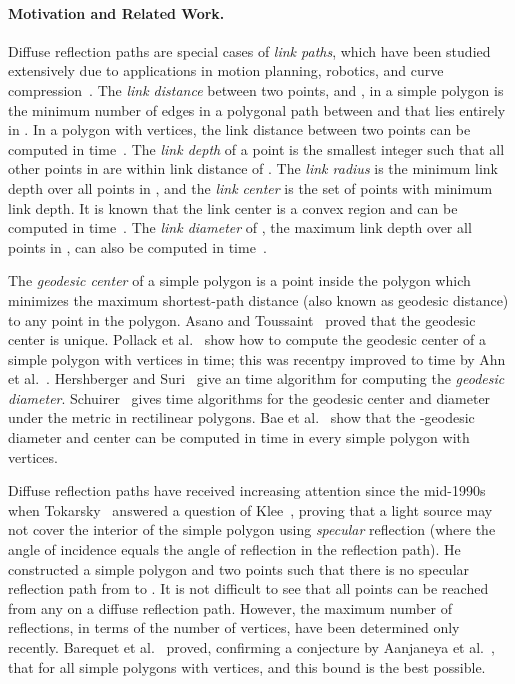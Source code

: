 \documentclass[12pt]{article}
\begin{document}
\paragraph{\bf Motivation and Related Work.}
Diffuse reflection paths are special cases of \emph{link paths}, which have been studied extensively due to applications in motion planning, robotics, and curve compression~\cite{G07,MSD00}.
The \emph{link distance} between two points,  and , in a simple polygon  is the minimum number of edges in a polygonal path between  and  that lies entirely in .
In a polygon  with  vertices, the link distance between two points can be computed in  time~\cite{S86}.
The \emph{link depth} of a point  is the smallest integer  such that all other points in  are within link distance  of .
The \emph{link radius} is the minimum link depth over all points in , and the \emph{link center} is the set of points with minimum link depth.
It is known that the link center is a convex region and can be computed in  time~\cite{DLS92}.
The \emph{link diameter} of , the maximum link depth over all points in , can also be computed in  time~\cite{S90}.

The \emph{geodesic center} of a simple polygon is a point inside the polygon which minimizes the maximum shortest-path distance  (also known as geodesic distance) to any point in the polygon. Asano and Toussaint~\cite{AT85} proved that the geodesic center is unique. Pollack et al.~\cite{PSR89} show how to compute the geodesic center of a simple polygon with  vertices in  time; this was recentpy improved to  time by Ahn et al.~\cite{ABB+15}. Hershberger and Suri~\cite{HS97} give an  time algorithm for computing the \emph{geodesic diameter}. Schuirer~\cite{Sch94} gives  time algorithms for the geodesic center and diameter under the  metric in rectilinear polygons. Bae et al.~\cite{BKOW14} show that the -geodesic diameter and center can be computed in  time in every simple polygon with  vertices.

Diffuse reflection paths have received increasing attention since the mid-1990s when Tokarsky~\cite{Tok95} answered a question of Klee~\cite{Kle69,Kle79}, proving that a light source may not cover the interior of the simple polygon using \emph{specular} reflection (where the angle of incidence equals the angle of reflection in the reflection path).
He constructed a simple polygon  and two points  such that there is no specular reflection path from  to . It is not difficult to see that all points  can be reached from any  on a diffuse reflection path. However, the maximum number of reflections, in terms of the number of vertices, have been determined only recently. Barequet et al.~\cite{Us} proved, confirming a conjecture by Aanjaneya et al.~\cite{ABP08}, that  for all simple polygons with  vertices, and this bound is the best possible.
\end{document}
